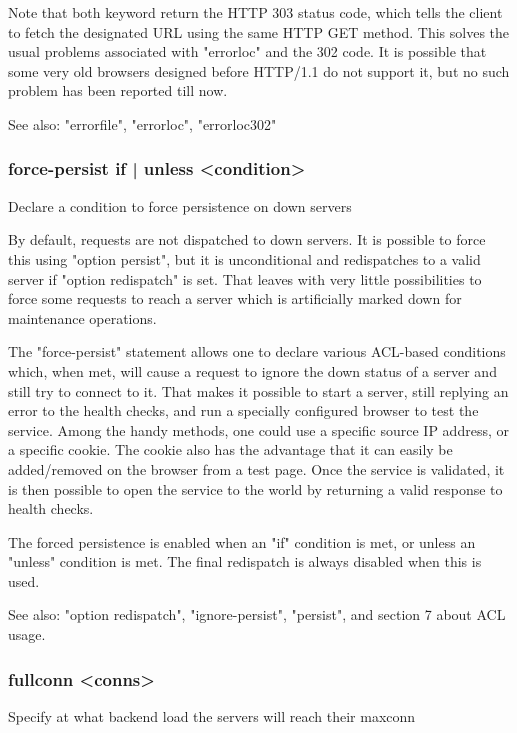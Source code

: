   Note that both keyword return the HTTP 303 status code, which tells the
  client to fetch the designated URL using the same HTTP GET method. This
  solves the usual problems associated with "errorloc" and the 302 code. It is
  possible that some very old browsers designed before HTTP/1.1 do not support
  it, but no such problem has been reported till now.

  See also: "errorfile", "errorloc", "errorloc302"

\subsubsection[force-persist]{force-persist { if | unless } <condition>}
  Declare a condition to force persistence on down servers
  

  By default, requests are not dispatched to down servers. It is possible to
  force this using "option persist", but it is unconditional and redispatches
  to a valid server if "option redispatch" is set. That leaves with very little
  possibilities to force some requests to reach a server which is artificially
  marked down for maintenance operations.

  The "force-persist" statement allows one to declare various ACL-based
  conditions which, when met, will cause a request to ignore the down status of
  a server and still try to connect to it. That makes it possible to start a
  server, still replying an error to the health checks, and run a specially
  configured browser to test the service. Among the handy methods, one could
  use a specific source IP address, or a specific cookie. The cookie also has
  the advantage that it can easily be added/removed on the browser from a test
  page. Once the service is validated, it is then possible to open the service
  to the world by returning a valid response to health checks.

  The forced persistence is enabled when an "if" condition is met, or unless an
  "unless" condition is met. The final redispatch is always disabled when this
  is used.

  See also: "option redispatch", "ignore-persist", "persist",
             and section 7 about ACL usage.

\subsubsection[fullconn]{fullconn <conns>}
  Specify at what backend load the servers will reach their maxconn
  
